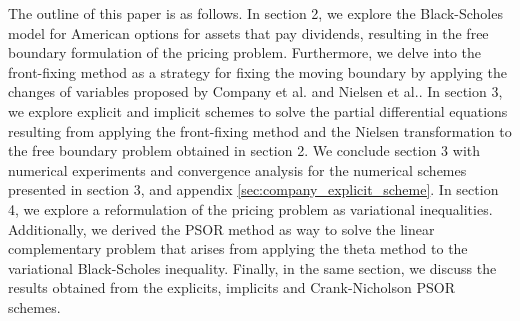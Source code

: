 The outline of this paper is as follows. In section 2, we explore the Black-Scholes model for American options for assets that pay dividends, resulting in the free boundary formulation of the pricing problem. Furthermore, we delve into the front-fixing method as a strategy for fixing the moving boundary by applying the changes of variables proposed by Company et al.\cite{company_egorova_jodar_2014} and Nielsen et al.\cite{nielsen_2001}. In section 3, we explore explicit and implicit schemes to solve the partial differential equations resulting from applying the front-fixing method and the Nielsen transformation to the free boundary problem obtained in section 2. We conclude section 3 with numerical experiments and convergence analysis for the numerical schemes presented in section 3, and appendix \ref{sec:company_explicit_scheme}. In section 4, we explore a reformulation of the pricing problem as variational inequalities. Additionally, we derived the PSOR method as way to solve the linear complementary problem that arises from applying the theta method to the variational Black-Scholes inequality. Finally, in the same section, we discuss the results obtained from the explicits, implicits and Crank-Nicholson PSOR schemes.
